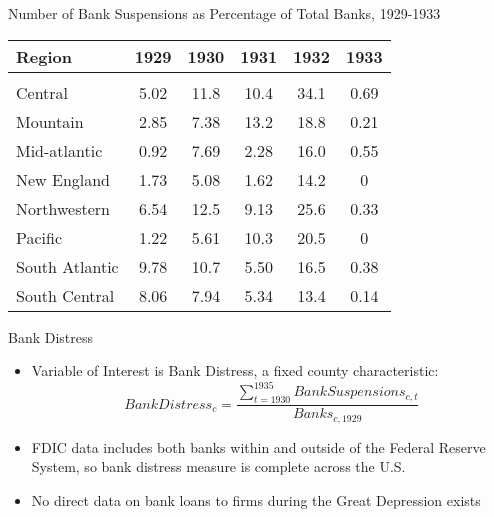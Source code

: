 \documentclass[11pt]{beamer}
\begin{document}
\begin{frame}{Number of Bank Suspensions as Percentage of Total Banks, 1929-1933}
\begin{table}  \tiny{
\begin{tabular}{lccccc} 
Region & 1929 & 1930 & 1931 & 1932 & 1933\\
\hline \hline \\
Central & \multicolumn{1}{c}{5.02} & \multicolumn{1}{c}{11.8} & \multicolumn{1}{c}{10.4} & \multicolumn{1}{c}{34.1} & \multicolumn{1}{c}{0.69}\\
 Mountain & \multicolumn{1}{c}{2.85} & \multicolumn{1}{c}{7.38} & \multicolumn{1}{c}{13.2} & \multicolumn{1}{c}{18.8} & \multicolumn{1}{c}{0.21}\\
 Mid-atlantic & \multicolumn{1}{c}{0.92} & \multicolumn{1}{c}{7.69} & \multicolumn{1}{c}{2.28} & \multicolumn{1}{c}{16.0} & \multicolumn{1}{c}{0.55}\\
 New England & \multicolumn{1}{c}{1.73} & \multicolumn{1}{c}{5.08} & \multicolumn{1}{c}{1.62} & \multicolumn{1}{c}{14.2} & \multicolumn{1}{c}{0}\\
 Northwestern & \multicolumn{1}{c}{6.54} & \multicolumn{1}{c}{12.5} & \multicolumn{1}{c}{9.13} & \multicolumn{1}{c}{25.6} & \multicolumn{1}{c}{0.33}\\
 Pacific & \multicolumn{1}{c}{1.22} & \multicolumn{1}{c}{5.61} & \multicolumn{1}{c}{10.3} & \multicolumn{1}{c}{20.5} & \multicolumn{1}{c}{0}\\
 South Atlantic & \multicolumn{1}{c}{9.78} & \multicolumn{1}{c}{10.7} & \multicolumn{1}{c}{5.50} & \multicolumn{1}{c}{16.5} & \multicolumn{1}{c}{0.38}\\
 South Central & \multicolumn{1}{c}{8.06} & \multicolumn{1}{c}{7.94} & \multicolumn{1}{c}{5.34} & \multicolumn{1}{c}{13.4} & \multicolumn{1}{c}{0.14}\\
\hline                                                                                                                             

\end{tabular}
}
\end{table}
\end{frame}

\begin{frame}{Bank Distress}
\begin{itemize}
\item Variable of Interest is Bank Distress, a fixed county characteristic:
\[
BankDistress_c = \frac{\sum_{t=1930}^{1935} BankSuspensions_{c, t}} {Banks_{c, 1929}}
\]
\item FDIC data includes both banks within and outside of the Federal Reserve System, so bank distress measure is complete across the U.S.
\item No direct data on bank loans to firms during the Great Depression exists
\end{itemize}
\end{frame}
\end{document}
